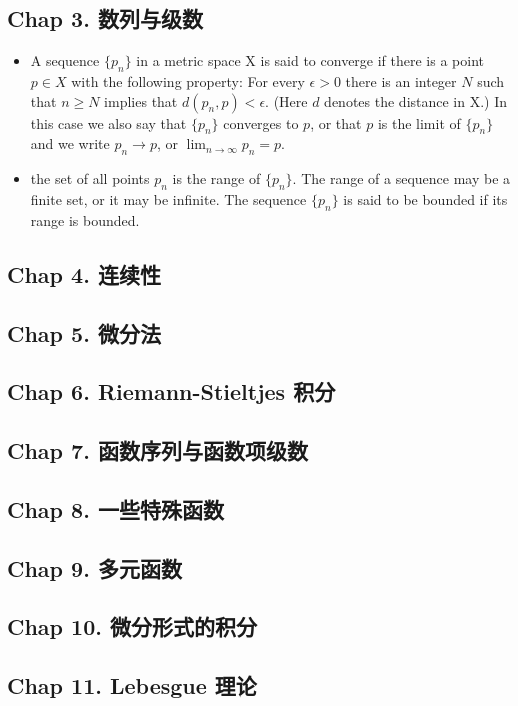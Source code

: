 \subsection{Chap 3. 数列与级数}
\begin{itemize}
\item A sequence $\{p_n\}$ in a metric space X is said to converge if there is a point $p \in X$ with the following property: For every $\epsilon > 0$ there is an integer $N$ such that $n \geqslant N$ implies that $d(p_n, p) < \epsilon$. (Here $d$ denotes the distance in X.) In this case we also say that $\{p_n\}$ converges to $p$, or that $p$ is the limit of $\{p_n\}$ and we write $p_n \to p$, or $\lim_{n\to \infty} p_n = p$.
\item the set of all points $p_n$ is the range of $\{p_n\}$. The range of a sequence may be a finite set, or it may be infinite. The sequence $\{p_n\}$ is said to be bounded if its range is bounded.
\end{itemize}


\subsection{Chap 4. 连续性}

\subsection{Chap 5. 微分法}

\subsection{Chap 6. Riemann-Stieltjes 积分}

\subsection{Chap 7. 函数序列与函数项级数}

\subsection{Chap 8. 一些特殊函数}

\subsection{Chap 9. 多元函数}

\subsection{Chap 10. 微分形式的积分}

\subsection{Chap 11. Lebesgue 理论}
